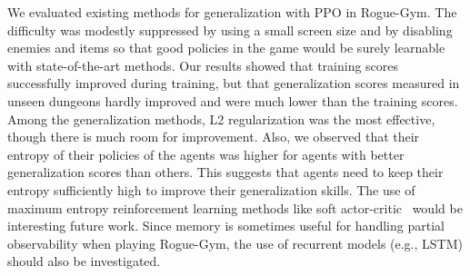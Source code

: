 \documentclass[conference]{IEEEtran}
\begin{document}
We evaluated existing methods for generalization with PPO in Rogue-Gym.
The difficulty was modestly suppressed by using a small screen size and
by disabling enemies and items so that good policies in the game would
be surely learnable with state-of-the-art methods.
Our results showed that training scores successfully improved during
training, but that generalization scores measured in unseen dungeons
hardly improved and were much lower than the training scores.
Among the generalization methods,  L2 regularization was the most
effective, though there is much room for improvement.
Also, we observed that their entropy of their policies of the agents was
higher for agents with better generalization scores than others.
This suggests that agents need to keep their entropy sufficiently high
to improve their generalization skills. 
The use of maximum entropy reinforcement learning methods like soft
actor-critic~\cite{SAC} would be interesting future work.
Since memory is sometimes useful for handling partial observability
when playing Rogue-Gym, the use of recurrent models (e.g., LSTM) should
also be investigated.



\end{document}

